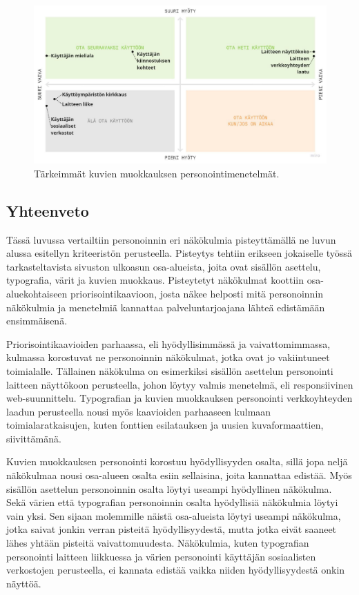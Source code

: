\documentclass[finnish, 12pt, a4paper, elec, utf8, a-1b]{aaltothesis}
\begin{document}
\begin{figure}[h]
    \centering
    \includegraphics[width=\textwidth]{images/images-priorization.pdf}
    \caption{Tärkeimmät kuvien muokkauksen personointimenetelmät.~\label{fig:images-priorization}}
\end{figure}

\subsection{Yhteenveto}

Tässä luvussa vertailtiin personoinnin eri näkökulmia pisteyttämällä ne luvun
alussa esitellyn kriteeristön perusteella. Pisteytys tehtiin erikseen jokaiselle
työssä tarkasteltavista sivuston ulkoasun osa-alueista, joita ovat sisällön
asettelu, typografia, värit ja kuvien muokkaus. Pisteytetyt näkökulmat koottiin
osa-aluekohtaiseen priorisointikaavioon, josta näkee helposti mitä
personoinnin näkökulmia ja menetelmiä kannattaa palveluntarjoajana lähteä
edistämään ensimmäisenä.

Priorisointikaavioiden parhaassa, eli hyödyllisimmässä ja vaivattomimmassa,
kulmassa korostuvat ne personoinnin näkökulmat, jotka ovat jo vakiintuneet
toimialalle. Tällainen näkökulma on esimerkiksi sisällön asettelun personointi
laitteen näyttökoon perusteella, johon löytyy valmis menetelmä, eli
responsiivinen web-suunnittelu. Typografian ja kuvien muokkauksen personointi
verkkoyhteyden laadun perusteella nousi myös kaavioiden parhaaseen kulmaan
toimialaratkaisujen, kuten fonttien esilatauksen ja uusien kuvaformaattien,
siivittämänä.

Kuvien muokkauksen personointi korostuu hyödyllisyyden osalta, sillä jopa neljä
näkökulmaa nousi osa-alueen osalta esiin sellaisina, joita kannattaa edistää.
Myös sisällön asettelun personoinnin osalta löytyi useampi hyödyllinen
näkökulma. Sekä värien että typografian personoinnin osalta hyödyllisiä
näkökulmia löytyi vain yksi. Sen sijaan molemmille näistä osa-alueista löytyi
useampi näkökulma, jotka saivat jonkin verran pisteitä hyödyllisyydestä, mutta
jotka eivät saaneet lähes yhtään pisteitä vaivattomuudesta. Näkökulmia, kuten
typografian personointi laitteen liikkuessa ja värien personointi käyttäjän
sosiaalisten verkostojen perusteella, ei kannata edistää vaikka niiden
hyödyllisyydestä onkin näyttöä.
\end{document}
